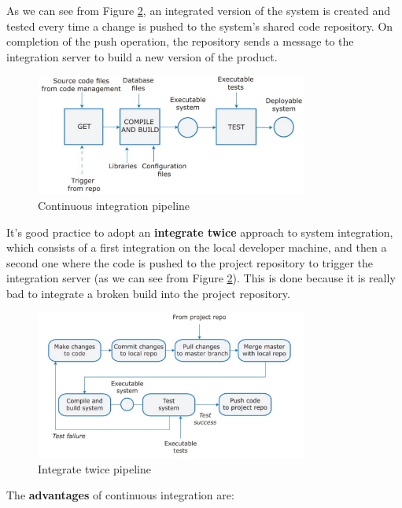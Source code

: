 As we can see from Figure \ref{fig:continuous-integration}, an integrated version of the system is created and tested every time a change is pushed to the system’s shared code repository. On completion of the push operation, the repository sends a message to the integration server to build a new version of the product.

\begin{figure} [H]
    \centering
    \includegraphics[width=0.8\textwidth]{images/DevOps/continuos-integration.PNG}
    \caption{Continuous integration pipeline}
    \label{fig:continuous-integration}
\end{figure} 

It's good practice to adopt an \textbf{integrate twice} approach to system integration, which consists of a first integration on the local developer machine, and then a second one where the code is pushed to the project repository to trigger the integration server (as we can see from Figure \ref{fig:continuous-integration}). This is done because it is really bad to integrate a broken build into the project repository.

\begin{figure} [H]
    \centering
    \includegraphics[width=0.8\textwidth]{images/DevOps/integrate-twice.PNG}
    \caption{Integrate twice pipeline}
    \label{fig:continuous-integration}
\end{figure} 

The \textbf{advantages} of continuous integration are:

